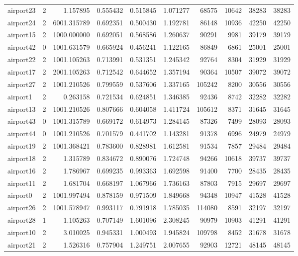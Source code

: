 \begin{longtable}{|l|r|r|r|r|r|r|r|r|r|}
airport23 & 2 & 1.157895 & 0.555432 & 0.515845 & 1.071277 & 68575 & 10642 & 38283 & 38283 \\
airport24 & 2 & 6001.315789 & 0.692351 & 0.500430 & 1.192781 & 86148 & 10936 & 42250 & 42250 \\
airport15 & 2 & 1000.000000 & 0.692051 & 0.568586 & 1.260637 & 90291 & 9981 & 39179 & 39179 \\
airport42 & 0 & 1001.631579 & 0.665924 & 0.456241 & 1.122165 & 86849 & 6861 & 25001 & 25001 \\
airport22 & 2 & 1001.105263 & 0.713991 & 0.531351 & 1.245342 & 92764 & 8304 & 31929 & 31929 \\
airport17 & 2 & 2001.105263 & 0.712542 & 0.644652 & 1.357194 & 90364 & 10507 & 39072 & 39072 \\
airport27 & 2 & 1001.210526 & 0.799559 & 0.537606 & 1.337165 & 105242 & 8200 & 30556 & 30556 \\
airport1 & 2 & 0.263158 & 0.721534 & 0.624851 & 1.346385 & 92436 & 8742 & 32282 & 32282 \\
airport13 & 2 & 1001.210526 & 0.807666 & 0.604058 & 1.411724 & 105612 & 8371 & 31645 & 31645 \\
airport43 & 0 & 1001.315789 & 0.669172 & 0.614973 & 1.284145 & 87326 & 7499 & 28093 & 28093 \\
airport44 & 0 & 1001.210526 & 0.701579 & 0.441702 & 1.143281 & 91378 & 6996 & 24979 & 24979 \\
airport19 & 2 & 1001.368421 & 0.783600 & 0.828981 & 1.612581 & 91534 & 7857 & 29484 & 29484 \\
airport18 & 2 & 1.315789 & 0.834672 & 0.890076 & 1.724748 & 94266 & 10618 & 39737 & 39737 \\
airport16 & 2 & 1.786967 & 0.699235 & 0.993363 & 1.692598 & 91400 & 7700 & 28435 & 28435 \\
airport11 & 2 & 1.681704 & 0.668197 & 1.067966 & 1.736163 & 87803 & 7915 & 29697 & 29697 \\
airport0 & 2 & 1001.997494 & 0.878159 & 0.971509 & 1.849668 & 94348 & 10947 & 41528 & 41528 \\
airport26 & 2 & 1001.578947 & 0.993117 & 0.791918 & 1.785035 & 114080 & 8591 & 32197 & 32197 \\
airport28 & 1 & 1.105263 & 0.707149 & 1.601096 & 2.308245 & 90979 & 10903 & 41291 & 41291 \\
airport10 & 2 & 3.010025 & 0.945331 & 1.000493 & 1.945824 & 109798 & 8452 & 31678 & 31678 \\
airport21 & 2 & 1.526316 & 0.757904 & 1.249751 & 2.007655 & 92903 & 12721 & 48145 & 48145 \\

\end{longtable}
